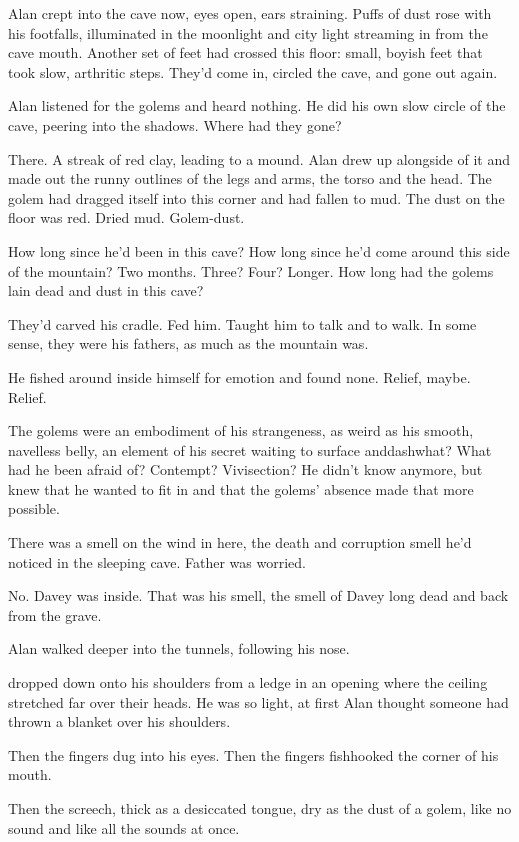 Alan crept into the cave now, eyes open, ears straining.  Puffs of
dust rose with his footfalls, illuminated in the moonlight and city
light streaming in from the cave mouth.  Another set of feet had
crossed this floor:  small, boyish feet that took slow, arthritic
steps.  They'd come in, circled the cave, and gone out again.

Alan listened for the golems and heard nothing.  He did his own slow
circle of the cave, peering into the shadows.  Where had they gone?

There.  A streak of red clay, leading to a mound.  Alan drew up
alongside of it and made out the runny outlines of the legs and arms,
the torso and the head.  The golem had dragged itself into this corner
and had fallen to mud.  The dust on the floor was red.  Dried mud. 
Golem-dust.

How long since he'd been in this cave?  How long since he'd come
around this side of the mountain?  Two months.  Three?  Four?  Longer. 
How long had the golems lain dead and dust in this cave?

They'd carved his cradle.  Fed him.  Taught him to talk and to walk. 
In some sense, they were his fathers, as much as the mountain was.

He fished around inside himself for emotion and found none.  Relief,
maybe.  Relief.

The golems were an embodiment of his strangeness, as weird as his
smooth, navelless belly, an element of his secret waiting to surface
anddash{}what?  What had he been afraid of?  Contempt?  Vivisection?  He
didn't know anymore, but knew that he wanted to fit in and that the
golems' absence made that more possible.

There was a smell on the wind in here, the death and corruption smell
he'd noticed in the sleeping cave.  Father was worried.

No.  Davey was inside.  That was his smell, the smell of Davey long
dead and back from the grave.

Alan walked deeper into the tunnels, following his nose.

 dropped down onto his shoulders from a ledge in an opening where
the ceiling stretched far over their heads.  He was so light, at first
Alan thought someone had thrown a blanket over his shoulders.

Then the fingers dug into his eyes.  Then the fingers fishhooked the
corner of his mouth.

Then the screech, thick as a desiccated tongue, dry as the dust of a
golem, like no sound and like all the sounds at once.

